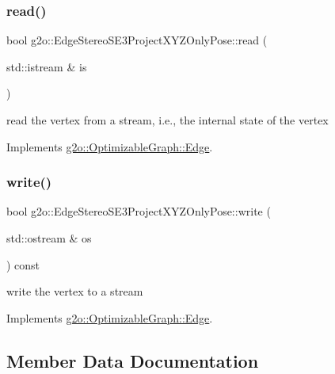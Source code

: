 \subsubsection{\texorpdfstring{read()}{read()}}
{\footnotesize\ttfamily bool g2o\+::\+Edge\+Stereo\+S\+E3\+Project\+X\+Y\+Z\+Only\+Pose\+::read (\begin{DoxyParamCaption}\item[{std\+::istream \&}]{is }\end{DoxyParamCaption})\hspace{0.3cm}{\ttfamily [virtual]}}



read the vertex from a stream, i.\+e., the internal state of the vertex 



Implements \mbox{\hyperlink{classg2o_1_1_optimizable_graph_1_1_edge_a30cf69b762a06aa35e796d8af71632b0}{g2o\+::\+Optimizable\+Graph\+::\+Edge}}.

\mbox{\label{classg2o_1_1_edge_stereo_s_e3_project_x_y_z_only_pose_a8e7cb830d9d0d9675733294b692bd3d8}} 
\subsubsection{\texorpdfstring{write()}{write()}}
{\footnotesize\ttfamily bool g2o\+::\+Edge\+Stereo\+S\+E3\+Project\+X\+Y\+Z\+Only\+Pose\+::write (\begin{DoxyParamCaption}\item[{std\+::ostream \&}]{os }\end{DoxyParamCaption}) const\hspace{0.3cm}{\ttfamily [virtual]}}



write the vertex to a stream 



Implements \mbox{\hyperlink{classg2o_1_1_optimizable_graph_1_1_edge_a804b9a2178249b9297c55b8fbbeda56e}{g2o\+::\+Optimizable\+Graph\+::\+Edge}}.



\subsection{Member Data Documentation}
\mbox{\label{classg2o_1_1_edge_stereo_s_e3_project_x_y_z_only_pose_a831d3e73bf61102622a7ac6af0475e7b}} 
